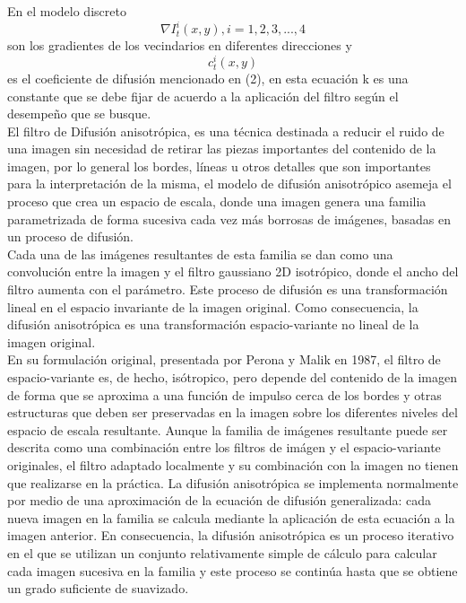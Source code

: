 En el modelo discreto \begin{displaymath} \nabla I_t^i(x,y), i= 1,2,3,...,4 \end{displaymath} son los gradientes de los vecindarios en diferentes direcciones y \begin{displaymath} c_t^i(x,y) \end{displaymath} es el coeficiente de difusi\'on mencionado en (2), en esta ecuaci\'on k es una constante que se debe fijar de acuerdo a la aplicaci\'on del filtro seg\'un el desempe\~no que se busque.\\

El filtro de Difusi\'on anisotr\'opica, es una técnica destinada a reducir el ruido de una imagen sin necesidad de retirar las piezas importantes del contenido de la imagen, por lo general los bordes, líneas u otros detalles que son importantes para la interpretación de la misma, el modelo de difusión anisotrópico asemeja el proceso que crea un espacio de escala, donde una imagen genera una familia parametrizada de forma sucesiva cada vez más borrosas de imágenes, basadas en un proceso de difusión.\\ 
Cada una de las im\'agenes resultantes de esta familia se dan como una convoluci\'on entre la imagen y el filtro gaussiano 2D isotr\'opico, donde el ancho del filtro aumenta con el par\'ametro. Este proceso de difusi\'on es una transformación lineal en el espacio invariante de la imagen original. Como consecuencia, la difusi\'on anisotr\'opica es una transformaci\'on espacio-variante no lineal de la imagen original. \cite{wiki:difusionAnisotropica}\\
En su formulaci\'on original, presentada por Perona y Malik en 1987, \cite{rodriguez8evaluacion} el filtro de espacio-variante es, de hecho, is\'otropico, pero depende del contenido de la imagen de forma que se aproxima a una funci\'on de impulso cerca de los bordes y otras estructuras que deben ser preservadas en la imagen sobre los diferentes niveles del espacio de escala resultante.
Aunque la familia de im\'agenes resultante puede ser descrita como una combinaci\'on entre los filtros de im\'agen y el espacio-variante originales, el filtro adaptado localmente y su combinaci\'on con la imagen no tienen que realizarse en la pr\'actica. La difusi\'on anisotr\'opica se implementa normalmente por medio de una aproximaci\'on de la ecuaci\'on de difusi\'on generalizada: cada nueva imagen en la familia se calcula mediante la aplicaci\'on de esta ecuaci\'on a la imagen anterior. En consecuencia, la difusi\'on anisotr\'opica es un proceso iterativo en el que se utilizan un conjunto relativamente simple de c\'alculo para calcular cada imagen sucesiva en la familia y este proceso se contin\'ua hasta que se obtiene un grado suficiente de suavizado. \cite{uribe2011evaluacion}\\ 


